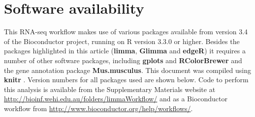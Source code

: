\documentclass[10pt,a4paper]{extarticle}\usepackage[]{graphicx}\usepackage[]{color}
\begin{document}
\section*{Software availability}
This RNA-seq workflow makes use of various packages available from version 3.4 of the Bioconductor project, running on R \cite{R} version 3.3.0 or higher. Besides the packages highlighted in this article (\textbf{limma}, \textbf{Glimma} and \textbf{edgeR}) it requires a number of other software packages, including \textbf{gplots} \cite{gplots} and \textbf{RColorBrewer} and the gene annotation package \textbf{Mus.musculus}. 
This document was compiled using \textbf{knitr} \cite{knitr2014, knitr2015, knitr2016}.
Version numbers for all packages used are shown below.
Code to perform this analysis is available from the Supplementary Materials website at \newline \url{http://bioinf.wehi.edu.au/folders/limmaWorkflow/} and as a Bioconductor workflow from \newline \url{http://www.bioconductor.org/help/workflows/}.
%
%
%
\end{document}
